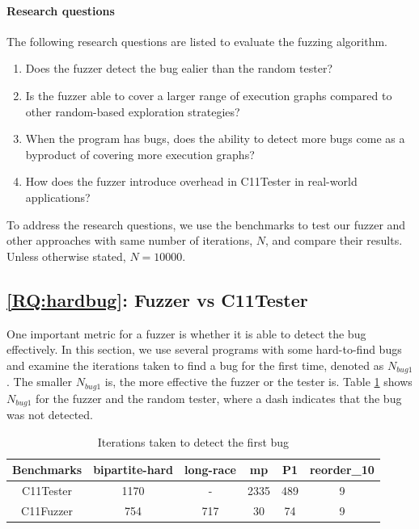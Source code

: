 \paragraph*{Research questions} The following research questions are listed to evaluate the fuzzing algorithm.
\begin{enumerate}[label=RQ\arabic*]
	\item Does the fuzzer detect the bug ealier than the random tester? \label{RQ:hardbug}
	\item Is the fuzzer able to cover a larger range of execution graphs compared to other random-based exploration strategies? \label{RQ:coverage}
	\item When the program has bugs, does the ability to detect more bugs come as a byproduct of covering more execution graphs? \label{RQ:bug}
	\item How does the fuzzer introduce overhead in C11Tester in real-world applications? \label{RQ:overhead}
\end{enumerate}

To address the research questions, we use the benchmarks to test our fuzzer and other approaches with same number of iterations, $N$, and compare their results. Unless otherwise stated, $N = 10000$.

\subsection{\ref*{RQ:hardbug}: Fuzzer vs C11Tester}

One important metric for a fuzzer is whether it is able to detect the bug effectively. In this section, we use several programs with some hard-to-find bugs and examine the iterations taken to find a bug for the first time, denoted as $N_{bug1}$. The smaller $N_{bug1}$ is, the more effective the fuzzer or the tester is. Table \ref{c11fuzzer-hardbug} shows $N_{bug1}$ for the fuzzer and the random tester, where a dash indicates that the bug was not detected.

\begin{table}[h!]
	\centering
	\begin{tabular}{ |c|ccccc| }
		\hline
		Benchmarks & bipartite-hard & long-race & mp & P1  & reorder\_10 \\
		\hline
		C11Tester  & 1170           & -         & 2335  & 489 & 9           \\
		C11Fuzzer  & 754            & 717       & 30 & 74  & 9           \\
		\hline
	\end{tabular}
	\caption{Iterations taken to detect the first bug}
	\label{c11fuzzer-hardbug}
\end{table}


